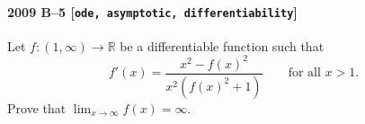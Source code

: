 \paragraph{2009 B--5 \textnormal{[\texttt{ode, asymptotic, differentiability}]}}
Let $f: (1, \infty) \to \mathbb{R}$ be a differentiable function such that
\[
 f'(x) = \frac{x^2 - f(x)^2}{x^2 (f(x)^2 + 1)}
\qquad \mbox{for all $x>1$.}
\]
Prove that $\lim_{x \to \infty} f(x) = \infty$.
